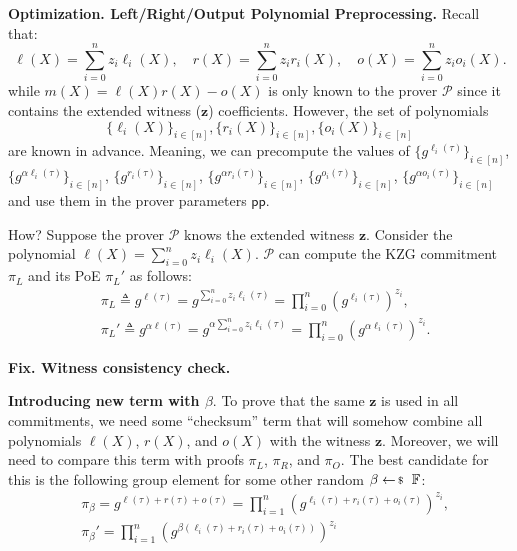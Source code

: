 \documentclass[../lecture-notes-148x210.tex]{subfiles}
\begin{document}
\textcolor{blue!75!gray}{\textbf{Optimization. Left/Right/Output Polynomial Preprocessing.}} Recall that:
\begin{equation*}
    \ell(X) = \sum_{i=0}^n z_i\ell_i(X), \quad r(X) = \sum_{i=0}^n z_i r_i(X), \quad o(X) = \sum_{i=0}^n z_io_i(X).
\end{equation*}
while $m(X) = \ell(X)r(X) - o(X)$ is only known to the prover $\mathcal{P}$ since it contains the extended witness ($\mathbf{z}$) coefficients. However, the set of polynomials
\begin{equation*}
    \{\ell_i(X)\}_{i \in [n]}, \{r_i(X)\}_{i \in [n]}, \{o_i(X)\}_{i \in [n]}
\end{equation*}
are known in advance. Meaning, we can precompute the values of $\{g^{\ell_i(\tau)}\}_{i \in [n]}$, $\{g^{\alpha \ell_i(\tau)}\}_{i \in [n]}$, $\{g^{r_i(\tau)}\}_{i \in [n]}$, $\{g^{\alpha r_i(\tau)}\}_{i \in [n]}$, $\{g^{o_i(\tau)}\}_{i \in [n]}$, $\{g^{\alpha o_i(\tau)}\}_{i \in [n]}$ and use them in the prover parameters $\mathsf{pp}$.

How? Suppose the prover $\mathcal{P}$ knows the extended witness $\mathbf{z}$. Consider the polynomial $\ell(X) = \sum_{i=0}^n z_i\ell_i(X)$. $\mathcal{P}$ can compute the KZG commitment $\pi_L$ and its PoE $\pi_L'$ as follows:
\begin{equation*}
    \begin{aligned}
        &\pi_L \triangleq g^{\ell(\tau)} = g^{\sum_{i=0}^n z_i\ell_i(\tau)} = \prod_{i=0}^n (g^{\ell_i(\tau)})^{z_i}, \\
        &\pi_L' \triangleq g^{\alpha \ell(\tau)} = g^{\alpha \sum_{i=0}^n z_i\ell_i(\tau)} = \prod_{i=0}^n (g^{\alpha \ell_i(\tau)})^{z_i}.        
    \end{aligned}
\end{equation*}

\textcolor{green!50!black}{\textbf{Fix. Witness consistency check.}} 

\textbf{Introducing new term with $\beta$}. To prove that the same $\mathbf{z}$ is used in all commitments, we need some ``checksum'' term that will somehow combine all polynomials $\ell(X)$, $r(X)$, and $o(X)$ with the witness $\mathbf{z}$. Moreover, we will need to compare this term with proofs $\pi_L$, $\pi_R$, and $\pi_O$. The best candidate for this is the following group element for some other random $\beta \leftarrowS \mathbb{F}$:
\begin{equation*}
    \begin{aligned}
        &\pi_{\beta} = g^{\ell(\tau) + r(\tau) + o(\tau)} = \prod_{i=1}^n (g^{\ell_i(\tau) + r_i(\tau) + o_i(\tau)})^{z_i}, \\ 
        &\pi_{\beta}' = \prod_{i=1}^n (g^{\beta(\ell_i(\tau) + r_i(\tau) + o_i(\tau))})^{z_i}        
    \end{aligned}
\end{equation*}
\end{document}
